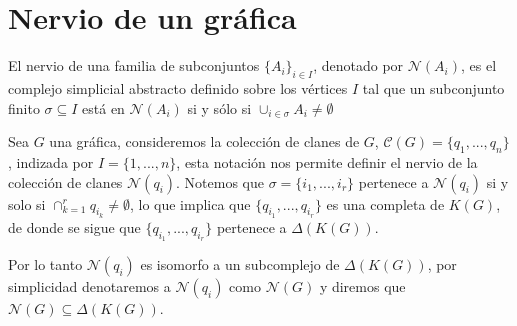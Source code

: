 \section{Nervio de un gráfica}
\begin{Defi} 
El nervio de una familia de subconjuntos ${\{A_i\}}_{i\in I}$, denotado por $\mathcal{N}(A_i)$, es el complejo simplicial abstracto definido sobre los vértices $I$ tal que un subconjunto finito $\sigma \subseteq I$ está en $\mathcal{N}(A_i)$ si y sólo si ${\cup}_{i\in \sigma}A_i \neq \emptyset$
\end{Defi}
\begin{Ejem}
Sea $G$ una gráfica, consideremos la colección de clanes de $G$, $\mathcal{C}(G) = \{q_1,...,q_n\}$, indizada por $I =\{1,...,n\}$, esta notación nos permite definir el nervio de la colección de clanes $\mathcal{N}(q_i)$. Notemos que $\sigma = \{i_1,...,i_r\}$ pertenece a $\mathcal{N}(q_i)$ si y solo si $\cap_{k=1}^{r}q_{i_k}\neq\emptyset$, lo que implica que $\{q_{i_1},...,q_{i_r}\}$ es una completa de $K(G)$, de donde se sigue que $\{q_{i_1},...,q_{i_r}\}$ pertenece a $\Delta(K(G))$.

Por lo tanto $\mathcal{N}(q_i)$ es isomorfo a un subcomplejo de $\Delta(K(G))$, por simplicidad denotaremos a $\mathcal{N}(q_i)$ como $\mathcal{N}(G)$ y diremos que $\mathcal{N}(G)\subseteq \Delta(K(G))$.
\end{Ejem}

